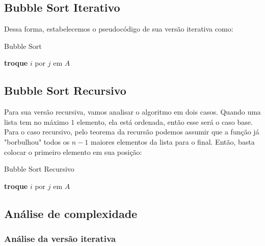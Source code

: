 \subsection{Bubble Sort Iterativo}

Dessa forma, estabelecemos o pseudocódigo de sua versão iterativa como:

\begin{algorithm}
	\caption{Bubble Sort}
	\label{algo:bubble_sort_it}
	\begin{algorithmic}[1]
		\Statex
		\State \textbf{troque} $i$ por $j$ em $A$
		\EndIf
		\EndFor
		\EndFor
		\EndFunction
	\end{algorithmic}
\end{algorithm}
\FloatBarrier

\subsection{Bubble Sort Recursivo}

Para sua versão recursiva, vamos analisar o algoritmo em dois casos. Quando uma lista tem no máximo $1$ elemento, ela está ordenada, então esse será o caso base. Para o caso recursivo, pelo teorema da recursão podemos assumir que a função já "borbulhou" todos os $n - 1$ maiores elementos da lista para o final. Então, basta colocar o primeiro elemento em sua posição:

\begin{algorithm}
	\caption{Bubble Sort Recursivo}
	\label{algo:bubble_sort_recursivo}
	\begin{algorithmic}[1]
		\Statex
		\Return{}
		\EndIf
		\State \textbf{troque} $i$ por $j$ em $A$
		\EndIf
		\EndFor
		\State {}
		\EndFunction
	\end{algorithmic}
\end{algorithm}
\FloatBarrier

\subsection{Análise de complexidade}

\subsubsection{Análise da versão iterativa}


